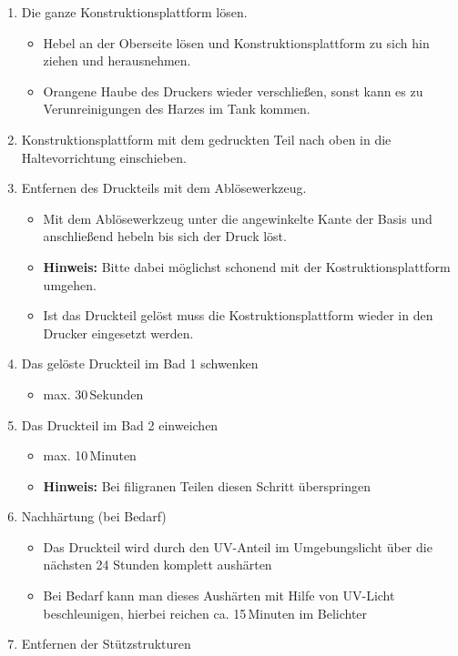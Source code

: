 \documentclass{\basedir/fablab-document}
\begin{document}
	\begin{enumerate}
	\item Die ganze Konstruktionsplattform lösen.
	\begin{itemize}
		\item Hebel an der Oberseite lösen und Konstruktionsplattform zu sich hin ziehen und herausnehmen.
		\item Orangene Haube des Druckers wieder verschließen, sonst kann es zu Verunreinigungen des Harzes im Tank kommen.
	\end{itemize}
	\item Konstruktionsplattform mit dem gedruckten Teil nach oben in die Haltevorrichtung einschieben.
	\item Entfernen des Druckteils mit dem Ablösewerkzeug.
	\begin{itemize}
		\item Mit dem Ablösewerkzeug unter die angewinkelte Kante der Basis und anschließend hebeln bis sich der Druck löst.
		\item \textbf{Hinweis:} Bitte dabei möglichst schonend mit der Kostruktionsplattform umgehen.
		\item Ist das Druckteil gelöst muss die Kostruktionsplattform wieder in den Drucker eingesetzt werden.
	\end{itemize}
	\item Das gelöste Druckteil im Bad 1 schwenken
	\begin{itemize}
		\item max. 30\,Sekunden
	\end{itemize}
	\item Das Druckteil im Bad 2 einweichen
	\begin{itemize}
		\item max. 10\,Minuten
		\item \textbf{Hinweis:} Bei filigranen Teilen diesen Schritt überspringen
	\end{itemize}
	\item Nachhärtung (bei Bedarf)
		\begin{itemize}
		\item Das Druckteil wird durch den UV-Anteil im Umgebungslicht über die nächsten 24 Stunden komplett aushärten 
		\item Bei Bedarf kann man dieses Aushärten mit Hilfe von UV-Licht beschleunigen, hierbei reichen ca. 15\,Minuten im Belichter
	\end{itemize}
	\item Entfernen der Stützstrukturen
	
	\end{enumerate}
	
\end{document}
